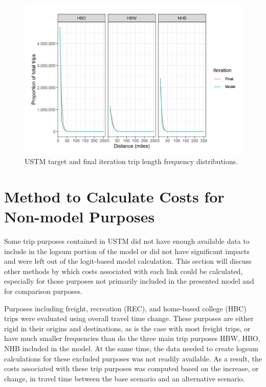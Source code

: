 \begin{figure}

{\centering \includegraphics[width=0.75\linewidth]{figures/chapter3/tlfd1.png}

}

\caption{USTM target and final iteration trip length frequency distributions.}\label{fig:ustm_tlfd}
\end{figure}


\section{Method to Calculate Costs for Non-model Purposes}

Some trip purposes contained in USTM did not have enough available data to
include in the logsum portion of the model or did not have
significant impacts and were left out of the logit-based model
calculation. This section will discuss other methods by which costs
associated with each link could be calculated, especially for those
purposes not primarily included in the presented model and for comparison purposes.

Purposes including freight, recreation (REC), and home-based college
(HBC) trips were evaluated using overall travel time change. These
purposes are either rigid in their origins and destinations, as is the
case with most freight trips, or have much smaller frequencies than do the
three main trip purposes HBW, HBO, NHB included in the model. At the same time,
the data needed to create logsum calculations for these
excluded purposes was not readily available. As a result, the costs associated with these trip
purposes was computed based on the increase, or change, in travel time between the base
scenario and an alternative scenario.

